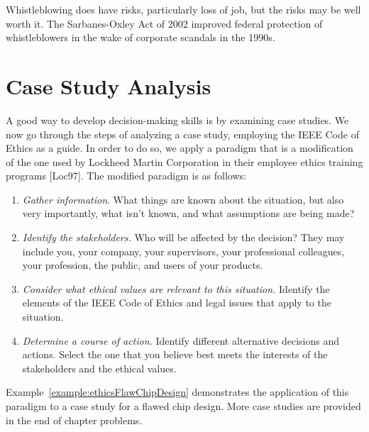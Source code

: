 Whistleblowing does have risks, particularly loss of job, but the risks
may be well worth it. The Sarbanes-Oxley Act of 2002 improved federal
protection of whistleblowers in the wake of corporate scandals in the
1990s.

\section{Case Study Analysis}
\label{section:case-study-analysis}

A good way to develop decision-making skills is by examining case
studies. We now go through the steps of analyzing a case study,
employing the IEEE Code of Ethics as a guide. In order to do so, we
apply a paradigm that is a modification of the one used by Lockheed
Martin Corporation in their employee ethics training programs
{[}Loc97{]}. The modified paradigm is as follows:

\begin{enumerate}
\def\labelenumi{\arabic{enumi}.}
\item
  \emph{Gather information}. What things are known about the situation,
  but also very importantly, what isn't known, and what assumptions are
  being made?
\item
  \emph{Identify the stakeholders.} Who will be affected by the
  decision? They may include you, your company, your supervisors, your
  professional colleagues, your profession, the public, and users of
  your products.
\item
  \emph{Consider what ethical values are relevant to this situation.}
  Identify the elements of the IEEE Code of Ethics and legal issues that
  apply to the situation.
\item
  \emph{Determine a course of action.} Identify different alternative
  decisions and actions. Select the one that you believe best meets the
  interests of the stakeholders and the ethical values.
\end{enumerate}

Example~\ref{example:ethicsFlawChipDesign} demonstrates the application 
of this paradigm to a case
study for a flawed chip design. More case studies are provided in the
end of chapter problems.

